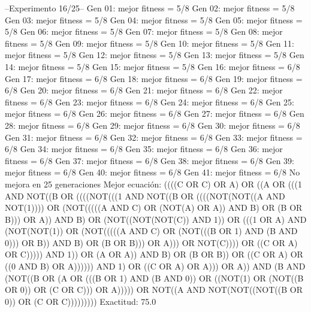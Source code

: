 --Experimento 
 16/25--
Gen 01: mejor fitness = 5/8
Gen 02: mejor fitness = 5/8
Gen 03: mejor fitness = 5/8
Gen 04: mejor fitness = 5/8
Gen 05: mejor fitness = 5/8
Gen 06: mejor fitness = 5/8
Gen 07: mejor fitness = 5/8
Gen 08: mejor fitness = 5/8
Gen 09: mejor fitness = 5/8
Gen 10: mejor fitness = 5/8
Gen 11: mejor fitness = 5/8
Gen 12: mejor fitness = 5/8
Gen 13: mejor fitness = 5/8
Gen 14: mejor fitness = 5/8
Gen 15: mejor fitness = 5/8
Gen 16: mejor fitness = 6/8
Gen 17: mejor fitness = 6/8
Gen 18: mejor fitness = 6/8
Gen 19: mejor fitness = 6/8
Gen 20: mejor fitness = 6/8
Gen 21: mejor fitness = 6/8
Gen 22: mejor fitness = 6/8
Gen 23: mejor fitness = 6/8
Gen 24: mejor fitness = 6/8
Gen 25: mejor fitness = 6/8
Gen 26: mejor fitness = 6/8
Gen 27: mejor fitness = 6/8
Gen 28: mejor fitness = 6/8
Gen 29: mejor fitness = 6/8
Gen 30: mejor fitness = 6/8
Gen 31: mejor fitness = 6/8
Gen 32: mejor fitness = 6/8
Gen 33: mejor fitness = 6/8
Gen 34: mejor fitness = 6/8
Gen 35: mejor fitness = 6/8
Gen 36: mejor fitness = 6/8
Gen 37: mejor fitness = 6/8
Gen 38: mejor fitness = 6/8
Gen 39: mejor fitness = 6/8
Gen 40: mejor fitness = 6/8
Gen 41: mejor fitness = 6/8
No mejora en 25 generaciones
Mejor ecuación: ((((C OR C) OR A) OR ((A OR (((1 AND NOT((B OR ((((NOT(((1 AND NOT((B OR ((((NOT(NOT((A AND NOT(1)))) OR (NOT(((((A AND C) OR (NOT(A) OR A)) AND B) OR (B OR B))) OR A)) AND B) OR (NOT((NOT(NOT(C)) AND 1)) OR (((1 OR A) AND (NOT(NOT(1)) OR (NOT(((((A AND C) OR (NOT(((B OR 1) AND (B AND 0))) OR B)) AND B) OR (B OR B))) OR A))) OR NOT(C)))) OR ((C OR A) OR C))))) AND 1)) OR (A OR A)) AND B) OR (B OR B)) OR ((C OR A) OR ((0 AND B) OR A)))))) AND 1) OR ((C OR A) OR A))) OR A)) AND (B AND (NOT((B OR (A OR (((B OR 1) AND (B AND 0)) OR ((NOT(1) OR (NOT((B OR 0)) OR (C OR C))) OR A))))) OR NOT((A AND NOT(NOT((NOT((B OR 0)) OR (C OR C)))))))))
 Exactitud: 75.0%

